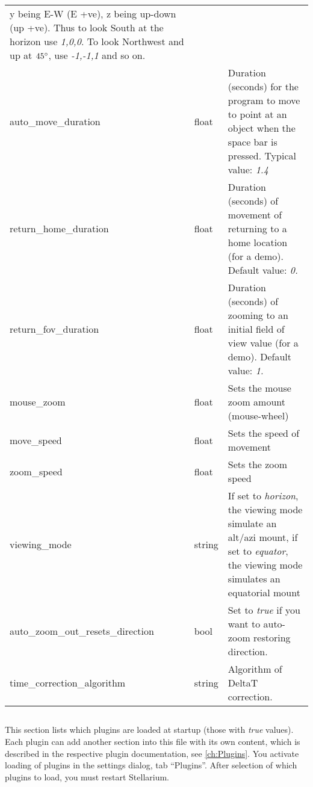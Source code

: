 \begin{longtable}{l|l|p{77mm}}
                                           y being E-W (E +ve), z being up-down (up +ve). Thus to look South at the horizon use \emph{1,0,0}. 
                                           To look Northwest and up at $45\degree$, use \emph{-1,-1,1} and so on.\\%
auto\_move\_duration            & float  & Duration (seconds) for the program to move to point at an object when the space bar is pressed. 
                                           Typical value: \emph{1.4}\\%
return\_home\_duration          & float  & Duration (seconds) of movement of returning to a home location (for a demo). Default value: \emph{0.}\\%
return\_fov\_duration           & float  & Duration (seconds) of zooming to an initial field of view value (for a demo). Default value: \emph{1.}\\%
mouse\_zoom                     & float  & Sets the mouse zoom amount (mouse-wheel)\\%
move\_speed                     & float  & Sets the speed of movement\\%
zoom\_speed                     & float  & Sets the zoom speed\\%
viewing\_mode                   & string & If set to \emph{horizon}, the viewing mode simulate an alt/azi mount, 
                                           if set to \emph{equator}, the viewing mode simulates an equatorial mount\\%
auto\_zoom\_out\_resets\_direction & bool & Set to \emph{true} if you want to auto-zoom restoring direction.\\%
time\_correction\_algorithm     & string & Algorithm of DeltaT correction.\\\bottomrule %
\end{longtable}

\subsection{}

This section lists which plugins are loaded at startup (those with
\emph{true} values). Each plugin can add another section into this
file with its own content, which is described in the respective plugin
documentation, see \ref{ch:Plugins}. You activate loading of plugins
in the  settings dialog, tab ``Plugins''. After selection of
which plugins to load, you must restart Stellarium.


